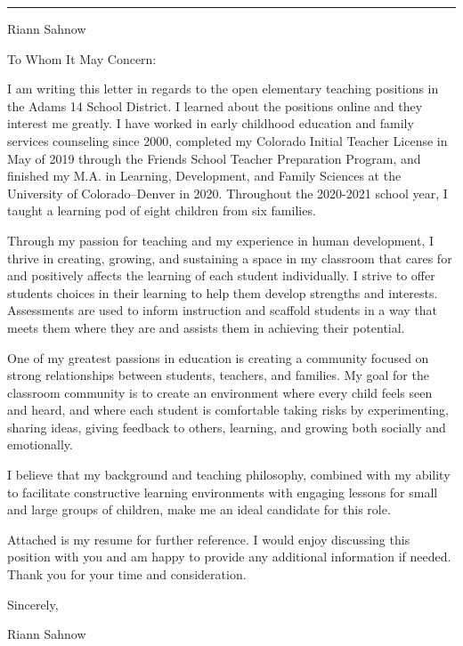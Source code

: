 \documentclass[letterpaper,10pt]{article}
\newcommand{\mblue}{\color{darkblue}}
\begin{document}
\pagestyle{empty}

{\mblue\rule{4.63in}{0.08cm}}

\vspace{-1.0pc}
\hfill{\Huge\mblue Riann Sahnow}

\vspace{2pc}
To Whom It May Concern:

\bigbreak\qquad I am writing this letter in regards to the open elementary
teaching positions in the Adams 14 School District. I learned about the positions
online and they interest me greatly. I have worked in early childhood
education and family services counseling since 2000, completed
my Colorado Initial Teacher License in May of 2019 through the Friends School Teacher Preparation
Program, and finished my M.A. in Learning, Development, and Family Sciences
at the University of Colorado--Denver in 2020. Throughout the 2020-2021 school year,
I taught a learning pod of eight children from six families.

\bigbreak\qquad Through my passion for teaching and my experience in
human development, I thrive in creating, growing, and sustaining a space in
my classroom that cares for and positively affects the learning of each student
individually. I strive to offer students choices in their learning to help them
develop strengths and interests. Assessments are used to inform instruction and
scaffold students in a way that meets them where they are and assists them in
achieving their potential.

\bigbreak\qquad One of my greatest passions in education is creating
a community focused on strong relationships between students, teachers, and
families. My goal for the classroom community is to create an environment
where every child feels seen and heard, and where each student is comfortable
taking risks by experimenting, sharing ideas, giving feedback to others, learning,
and growing both socially and emotionally.


\bigbreak\qquad I believe that my background and teaching philosophy, combined
with my ability to facilitate constructive learning environments with engaging
lessons for small and large groups of children, make me an ideal candidate for
this role.

\bigbreak\qquad Attached is my resume for further reference. I would enjoy
discussing this position with you and am happy to provide any additional
information if needed. Thank you for your time and consideration.

\bigbreak Sincerely,

\vspace{2pc} Riann Sahnow
\end{document}
